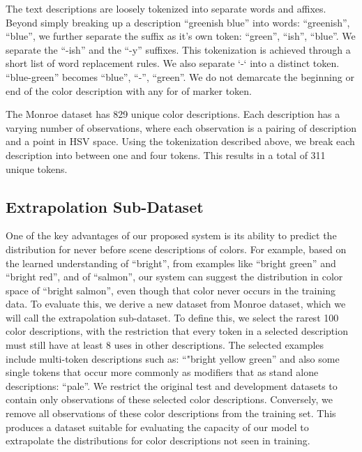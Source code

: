 \documentclass[11pt,letterpaper]{article}
\begin{document}
The text descriptions are loosely tokenized into separate words and affixes.
Beyond simply breaking up a description ``greenish blue'' into words: ``greenish'', ``blue'', we further separate the suffix as it's own token: ``green'', ``ish'', ``blue''.
We separate the ``-ish'' and the ``-y'' suffixes.
This tokenization is achieved through a short list of word replacement rules.
We also separate `-` into a distinct token. ``blue-green'' becomes ``blue'', ``-'', ``green''.
We do not demarcate the beginning or end of the color description with any for of marker token.

The Monroe dataset has 829 unique color descriptions.
Each description has a varying number of observations, where each observation is a pairing of description and a point in HSV space.
Using the tokenization described above, we break each description into between one and four tokens.
This results in a total of 311 unique tokens.

\subsection{Extrapolation Sub-Dataset}
One of the key advantages of our proposed system is its ability to predict the distribution for never before scene descriptions of colors.
For example, based on the learned understanding of ``bright'', from examples like ``bright green'' and ``bright red'', and of ``salmon'', our system can suggest the distribution in color space of ``bright salmon'', even though that color never occurs in the training data.
To evaluate this, we derive a new dataset from Monroe dataset, which we will call the extrapolation sub-dataset.
To define this, we select the rarest 100 color descriptions,
with the restriction that every token in a selected description must still have at least 8 uses in other descriptions.
The selected examples include multi-token descriptions such as: ``"bright yellow green'' and also some single tokens that occur more commonly as modifiers that as stand alone descriptions: ``pale''.
We restrict the original test and development datasets to contain only observations of these selected color descriptions.
Conversely, we remove all observations of these color descriptions from the training set.
This produces a dataset suitable for evaluating the capacity of our model to extrapolate the distributions for color descriptions not seen in training.
\end{document}
